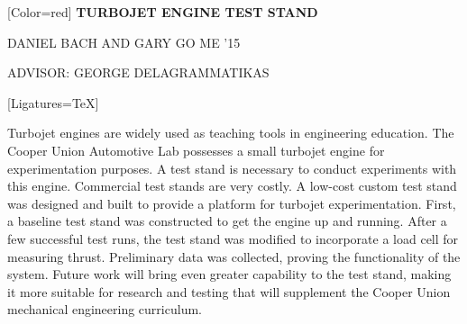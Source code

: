 \documentclass{article}
\begin{document}
{

	[Color=red]
	\fontsize{0.65in}{0.6in}\selectfont 
	\bfseries
	TURBOJET ENGINE TEST STAND
}

\vspace{0.25in}

{
	\fontsize{0.55in}{0.6in}\selectfont
	DANIEL BACH {\fontsize{0.4in}{0.6in}\selectfont AND} GARY GO {\fontsize{0.4in}{0.6in}\selectfont ME '15}
}

\vspace{0.1in}

{
	\fontsize{0.4in}{0.4in}\selectfont
	ADVISOR: GEORGE DELAGRAMMATIKAS
}

\vspace{0.2in}

{
	[Ligatures=TeX]
	\fontsize{0.41in}{0.46in}\selectfont


	Turbojet engines are widely used as teaching tools in engineering
	education.  The Cooper Union Automotive Lab possesses a small turbojet
	engine for experimentation purposes.  A test stand is necessary to conduct
	experiments with this engine.  Commercial test stands are very costly.  A
	low-cost custom test stand was designed and built to provide a platform
	for turbojet experimentation.  First, a baseline test stand was
	constructed to get the engine up and running.  After a few successful test
	runs, the test stand was modified to incorporate a load cell for measuring
	thrust.  Preliminary data was collected, proving the functionality of the
	system.  Future work will bring even greater capability to the test stand,
	making it more suitable for research and testing that will supplement the
	Cooper Union mechanical engineering curriculum.

}
\end{document}
